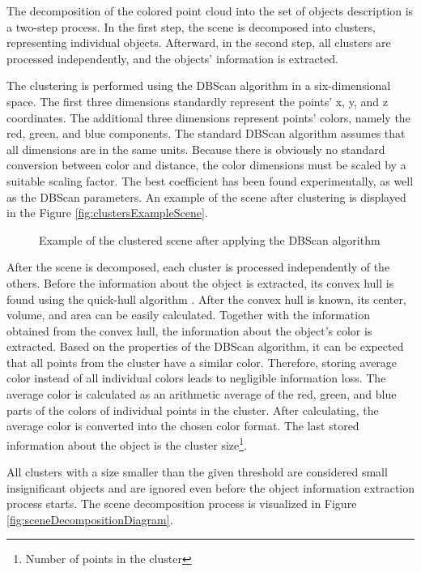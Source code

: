 The decomposition of the colored point cloud into the set of objects description is a two-step process. In the first step, the scene is decomposed into clusters, representing individual objects. Afterward, in the second step, all clusters are processed independently, and the objects' information is extracted.\par
The clustering is performed using the DBScan algorithm \cite{dbScan} in a six-dimensional space. The first three dimensions standardly represent the points' x, y, and z coordinates. The additional three dimensions represent points' colors, namely the red, green, and blue components. The standard DBScan algorithm assumes that all dimensions are in the same units. Because there is obviously no standard conversion between color and distance, the color dimensions must be scaled by a suitable scaling factor. The best coefficient has been found experimentally, as well as the DBScan parameters. An example of the scene after clustering is displayed in the Figure \ref{fig:clustersExampleScene}.\par

\begin{figure}[!tbp]
    \centering
    \hfill
    \caption{Example of the clustered scene after applying the DBScan algorithm}
    \label{fig:clustersExample}
\end{figure}

After the scene is decomposed, each cluster is processed independently of the others. Before the information about the object is extracted,  its convex hull is found using the quick-hull algorithm \cite{quickhull}. After the convex hull is known, its center, volume, and area can be easily calculated. Together with the information obtained from the convex hull, the information about the object's color is extracted. Based on the properties of the DBScan algorithm, it can be expected that all points from the cluster have a similar color. Therefore, storing average color instead of all individual colors leads to negligible information loss. The average color is calculated as an arithmetic average of the red, green, and blue parts of the colors of individual points in the cluster. After calculating, the average color is converted into the chosen color format. The last stored information about the object is the cluster size\footnote{Number of points in the cluster}.\par
All clusters with a size smaller than the given threshold are considered small insignificant objects and are ignored even before the object information extraction process starts. The scene decomposition process is visualized in Figure \ref{fig:sceneDecompositionDiagram}.

